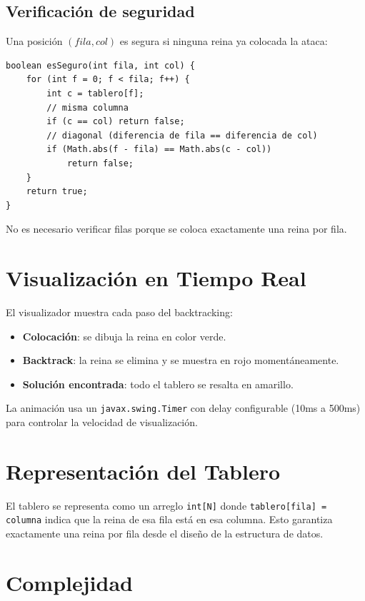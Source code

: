 \documentclass[12pt,a4paper]{article}
\begin{document}
\subsection{Verificación de seguridad}
Una posición $(fila, col)$ es segura si ninguna reina ya colocada la ataca:

\begin{lstlisting}
boolean esSeguro(int fila, int col) {
    for (int f = 0; f < fila; f++) {
        int c = tablero[f];
        // misma columna
        if (c == col) return false;
        // diagonal (diferencia de fila == diferencia de col)
        if (Math.abs(f - fila) == Math.abs(c - col))
            return false;
    }
    return true;
}
\end{lstlisting}

No es necesario verificar filas porque se coloca exactamente una reina por fila.

\section{Visualización en Tiempo Real}

El visualizador muestra cada paso del backtracking:
\begin{itemize}
  \item \textbf{Colocación}: se dibuja la reina en color verde.
  \item \textbf{Backtrack}: la reina se elimina y se muestra en rojo momentáneamente.
  \item \textbf{Solución encontrada}: todo el tablero se resalta en amarillo.
\end{itemize}

La animación usa un \texttt{javax.swing.Timer} con delay configurable (10ms a 500ms) para controlar la velocidad de visualización.

\section{Representación del Tablero}

El tablero se representa como un arreglo \texttt{int[N]} donde \texttt{tablero[fila] = columna} indica que la reina de esa fila está en esa columna. Esto garantiza exactamente una reina por fila desde el diseño de la estructura de datos.

\section{Complejidad}
\end{document}
